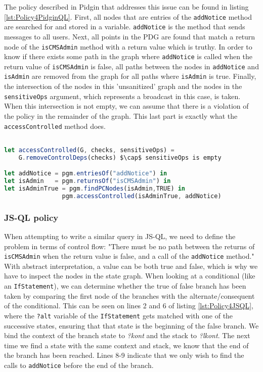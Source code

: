 The policy described in Pidgin that addresses this issue can be found in listing \ref{lst:Policy4PidginQL}. First, all nodes that are entries of the \texttt{addNotice} method are searched for and stored in a variable. \texttt{addNotice} is the method that sends messages to all users. Next, all points in the PDG are found that match a return node of the \texttt{isCMSAdmin} method with a return value which is truthy. In order to know if there exists some path in the graph where \texttt{addNotice} is called when the return value of \texttt{isCMSAdmin} is false, all paths between the nodes in \texttt{addNotice} and \texttt{isAdmin} are removed from the graph for all paths where \texttt{isAdmin} is true. Finally, the intersection of the nodes in this 'unsanitized' graph and the nodes in the \texttt{sensitiveOps} argument, which represents a broadcast in this case, is taken. When this intersection is not empty, we can assume that there is a violation of the policy in the remainder of the graph. This last part is exactly what the \texttt{accessControlled} method does.

\begin{lstlisting}[label={lst:Policy4PidginQL},language=JavaScript,caption=Policy 4 in PidginQL,mathescape=true]  % float=t?

let accessControlled(G, checks, sensitiveOps) = 
    G.removeControlDeps(checks) $\cap$ sensitiveOps is empty

let addNotice = pgm.entriesOf("addNotice") in
let isAdmin   = pgm.returnsOf("isCMSAdmin") in 
let isAdminTrue = pgm.findPCNodes(isAdmin,TRUE) in
                pgm.accessControlled(isAdminTrue, addNotice)
\end{lstlisting}

\subsubsection{JS-QL policy}

When attempting to write a similar query in JS-QL, we need to define the problem in terms of control flow: "There must be no path between the returns of \texttt{isCMSAdmin} when the return value is false, and a call of the \texttt{addNotice} method." With abstract interpretation, a value can be both true and false, which is why we have to inspect the nodes in the state graph. When looking at a conditional (like an \texttt{IfStatement}), we can determine whether the true of false branch has been taken by comparing the first node of the branches with the alternate/consequent of the conditional. This can be seen on lines 2 and 6 of listing \ref{lst:Policy4JSQL}, where the \texttt{?alt} variable of the \texttt{IfStatement} gets matched with one of the successive states, ensuring that that state is the beginning of the false branch. We bind the context of the branch state to \textit{?kont} and the stack to \textit{?lkont}. The next time we find a state with the same context and stack, we know that the end of the branch has been reached. Lines 8-9 indicate that we only wish to find the calls to \texttt{addNotice} before the end of the branch.

